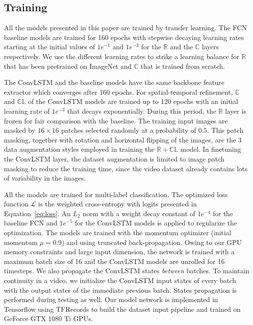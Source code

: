 \documentclass{svjour3}                     \smartqed
\begin{document}
\subsection{Training}\label{sec:training}
All the models presented in this paper are trained by transfer learning. 
The FCN baseline models are trained for 160 epochs with stepwise decaying learning rates starting at the initial values of $1e^{-1}$ and $1e^{-3}$ for the $\mathbb{R}$ and the $\mathbb{C}$ layers respectively. We use the different learning rates to strike a learning balance for $\mathbb{R}$ that has been pretrained on ImageNet and $\mathbb{C}$ that is trained from scratch.

The ConvLSTM and the baseline models have the same backbone feature extractor which converges after 160 epochs. 
For spatial-temporal refinement, $\mathbb{C}$ and $\mathbb{CL}$ of the ConvLSTM models are trained up to 120 epochs with an initial learning rate of $1e^{-3}$ that decays exponentially. 
During this period, the $\mathbb{R}$ layer is frozen for fair comparison with the baseline. 
The training input images are masked by $16\times16$ patches selected randomly at a probability of $0.5$. This patch masking, together with rotation and horizontal flipping of the images, are the 3 data augmentation styles employed in training the $\mathbb{R+CL}$ model. In finetuning the ConvLSTM layer, the dataset augmentation is limited to image patch masking to reduce the training time, since the video dataset already contains lots of variability in the images.

All the models are trained for multi-label classification.
The optimized loss function $\mathcal{L}$ is the weighted cross-entropy with logits presented in Equation~\ref{eq:loss}.
An $L_2$ norm with a weight decay constant of $1e^{-4}$ for the baseline FCN and $1e^{-5}$ for the ConvLSTM models is applied to regularize the optimization.
The models are trained with the momentum optimizer (initial momentum $\mu=0.9$) and using truncated back-propagation.
Owing to our GPU memory constraints and large input dimension, the network is trained with a maximum batch size of 16 and the ConvLSTM models are unrolled for 16 timesteps.
We also propagate the ConvLSTM states \emph{between} batches. To maintain continuity in a video, we initialize the ConvLSTM input states of every batch with the output states of the immediate previous batch.
States propagation is performed during testing as well.
Our model network is implemented in Tensorflow using TFRecords to build the dataset input pipeline and trained on GeForce GTX 1080 Ti GPUs.
\end{document}
